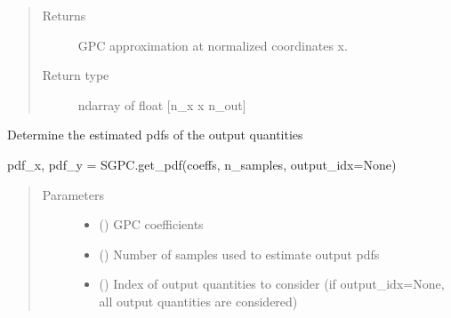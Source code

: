 \documentclass[letterpaper,10pt,english,openany,oneside]{sphinxmanual}
\begin{document}
\begin{fulllineitems}
\begin{fulllineitems}
\begin{quote}
\begin{description}
\begin{itemize}
\end{itemize}

\item[{Returns}] \leavevmode
{} \textendash{} GPC approximation at normalized coordinates x.

\item[{Return type}] \leavevmode
ndarray of float {[}n\_x x n\_out{]}

\end{description}\end{quote}

\end{fulllineitems}


\begin{fulllineitems}
\label{\detokenize{pygpc:pygpc.GPC.GPC.get_pdf}}
Determine the estimated pdfs of the output quantities

pdf\_x, pdf\_y = SGPC.get\_pdf(coeffs, n\_samples, output\_idx=None)
\begin{quote}\begin{description}
\item[{Parameters}] \leavevmode\begin{itemize}
\item {} 
 (\sphinxstyleliteralemphasis{\sphinxupquote{ {[}}}\sphinxstyleliteralemphasis{\sphinxupquote{{]}}}) \textendash{} GPC coefficients

\item {} 
 () \textendash{} Number of samples used to estimate output pdfs

\item {} 
 (\sphinxstyleliteralemphasis{\sphinxupquote{, }}\sphinxstyleliteralemphasis{\sphinxupquote{, }}\sphinxstyleliteralemphasis{\sphinxupquote{ {[}}}\sphinxstyleliteralemphasis{\sphinxupquote{{]}}}) \textendash{} Index of output quantities to consider (if output\_idx=None, all output quantities are considered)


\end{itemize}
\end{description}
\end{quote}
\end{fulllineitems}
\end{fulllineitems}
\end{document}
